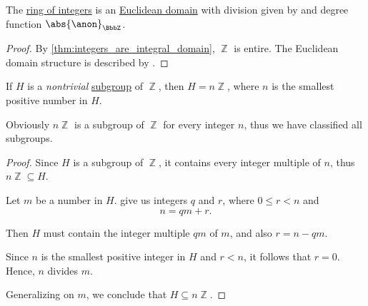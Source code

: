 \begin{proposition}\label{thm:integers_are_euclidean_domain}
  The \hyperref[def:integers]{ring of integers} is an \hyperref[def:euclidean_domain]{Euclidean domain} with division given by  and degree function \( \abs{\anon}_\BbbZ \).
\end{proposition}
\begin{proof}
  By \cref{thm:integers_are_integral_domain}, \( \BbbZ \) is entire. The Euclidean domain structure is described by .
\end{proof}

\begin{proposition}\label{thm:subgroups_of_integers}
  If \( H \) is a \emph{nontrivial} \hyperref[def:group/subobject]{subgroup} of \( \BbbZ \), then \( H = n\BbbZ \), where \( n \) is the smallest positive number in \( H \).
\end{proposition}
\begin{comments}
  \item Obviously \( n\BbbZ \) is a subgroup of \( \BbbZ \) for every integer \( n \), thus we have classified all subgroups.
\end{comments}
\begin{proof}
  Since \( H \) is a subgroup of \( \BbbZ \), it contains every integer multiple of \( n \), thus \( n\BbbZ \subseteq H \).

  Let \( m \) be a number in \( H \).  give us integers \( q \) and \( r \), where \( 0 \leq r < n \) and
  \begin{equation*}
    n = qm + r.
  \end{equation*}

  Then \( H \) must contain the integer multiple \( qm \) of \( m \), and also \( r = n - qm \).

  Since \( n \) is the smallest positive integer in \( H \) and \( r < n \), it follows that \( r = 0 \). Hence, \( n \) divides \( m \).

  Generalizing on \( m \), we conclude that \( H \subseteq n\BbbZ \).
\end{proof}

